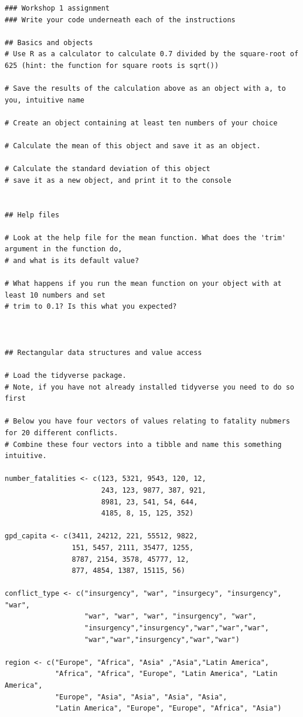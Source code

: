 \documentclass[
]{book}
\begin{document}
\begin{verbatim}
### Workshop 1 assignment
### Write your code underneath each of the instructions

## Basics and objects
# Use R as a calculator to calculate 0.7 divided by the square-root of 625 (hint: the function for square roots is sqrt())

# Save the results of the calculation above as an object with a, to you, intuitive name

# Create an object containing at least ten numbers of your choice

# Calculate the mean of this object and save it as an object.

# Calculate the standard deviation of this object
# save it as a new object, and print it to the console


## Help files

# Look at the help file for the mean function. What does the 'trim' argument in the function do, 
# and what is its default value?

# What happens if you run the mean function on your object with at least 10 numbers and set 
# trim to 0.1? Is this what you expected?



## Rectangular data structures and value access

# Load the tidyverse package. 
# Note, if you have not already installed tidyverse you need to do so first

# Below you have four vectors of values relating to fatality nubmers for 20 different conflicts. 
# Combine these four vectors into a tibble and name this something intuitive.

number_fatalities <- c(123, 5321, 9543, 120, 12, 
                       243, 123, 9877, 387, 921,
                       8981, 23, 541, 54, 644,
                       4185, 8, 15, 125, 352)

gpd_capita <- c(3411, 24212, 221, 55512, 9822,
                151, 5457, 2111, 35477, 1255,
                8787, 2154, 3578, 45777, 12,
                877, 4854, 1387, 15115, 56)
                
conflict_type <- c("insurgency", "war", "insurgecy", "insurgency", "war",
                   "war", "war", "war", "insurgency", "war",
                   "insurgency","insurgency","war","war","war",
                   "war","war","insurgency","war","war")
                   
region <- c("Europe", "Africa", "Asia" ,"Asia","Latin America",
            "Africa", "Africa", "Europe", "Latin America", "Latin America",
            "Europe", "Asia", "Asia", "Asia", "Asia",
            "Latin America", "Europe", "Europe", "Africa", "Asia")


\end{verbatim}
\end{document}
